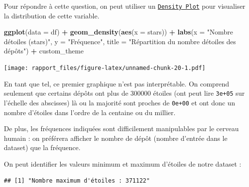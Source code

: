 \documentclass[
]{article}
\newenvironment{Shaded}{\begin{snugshade}}{\end{snugshade}}
\newcommand{\AttributeTok}[1]{\textcolor[rgb]{0.13,0.29,0.53}{#1}}
\newcommand{\FunctionTok}[1]{\textcolor[rgb]{0.13,0.29,0.53}{\textbf{#1}}}
\newcommand{\NormalTok}[1]{#1}
\newcommand{\SpecialCharTok}[1]{\textcolor[rgb]{0.81,0.36,0.00}{\textbf{#1}}}
\newcommand{\StringTok}[1]{\textcolor[rgb]{0.31,0.60,0.02}{#1}}
\begin{document}
Pour répondre à cette question, on peut utiliser un
\href{https://datavizcatalogue.com/methods/density_plot.html}{\texttt{Density\ Plot}}
pour visualiser la distribution de cette variable.

\begin{Shaded}
\begin{Highlighting}[]
\FunctionTok{ggplot}\NormalTok{(}\AttributeTok{data =}\NormalTok{ df) }\SpecialCharTok{+}
    \FunctionTok{geom\_density}\NormalTok{(}\FunctionTok{aes}\NormalTok{(}\AttributeTok{x =}\NormalTok{ stars)) }\SpecialCharTok{+}
    \FunctionTok{labs}\NormalTok{(}\AttributeTok{x =} \StringTok{"Nombre d\textquotesingle{}étoiles (\textquotesingle{}stars\textquotesingle{})"}\NormalTok{,}
         \AttributeTok{y =} \StringTok{"Fréquence"}\NormalTok{,}
         \AttributeTok{title =} \StringTok{"Répartition du nombre d\textquotesingle{}étoiles des dépôts"}\NormalTok{) }\SpecialCharTok{+}
\NormalTok{  custom\_theme}
\end{Highlighting}
\end{Shaded}

\texttt{[image: rapport\_files/figure-latex/unnamed-chunk-20-1.pdf]}

En tant que tel, ce premier graphique n'est pas interprétable. On
comprend seulement que certains dépôts ont plus de 300000 étoiles (ont
peut lire \texttt{3e+05} sur l'échelle des abscisses) là ou la majorité
sont proches de \texttt{0e+00} et ont donc un nombre d'étoiles dans
l'ordre de la centaine ou du millier.

De plus, les fréquences indiquées sont difficilement manipulables par le
cerveau humain : on préférera afficher le nombre de dépôt (nombre
d'entrée dans le dataset) que la fréquence.

On peut identifier les valeurs minimum et maximum d'étoiles de notre
dataset :

\begin{Shaded}
\end{Shaded}

\begin{verbatim}
## [1] "Nombre maximum d'étoiles : 371122"
\end{verbatim}

\begin{Shaded}
\end{Shaded}
\end{document}
